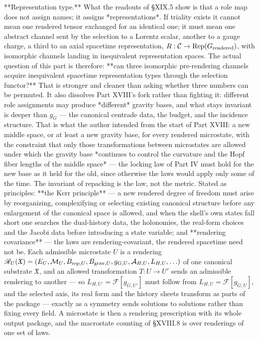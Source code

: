 **Representation type.** What the readouts of §XIX.5 show is that a role map does not assign names; it assigns *representations*. If triality exists it cannot mean one rendered tensor exchanged for an identical one; it must mean one abstract channel sent by the selection to a Lorentz scalar, another to a gauge charge, a third to an axial spacetime representation, $R:\mathcal C\to{\rm Rep}(G_{\rm rendered})$, with isomorphic channels landing in inequivalent representation spaces. The actual question of this part is therefore: **can three isomorphic pre-rendering channels acquire inequivalent spacetime representation types through the selection functor?** That is stronger and cleaner than asking whether three numbers can be permuted. It also dissolves Part XVIII's fork rather than fighting it: different role assignments may produce *different* gravity bases, and what stays invariant is deeper than $g_G$ — the canonical centrade data, the budget, and the incidence structure. That is what the author intended from the start of Part XVIII: a new middle space, or at least a new gravity base, for every rendered microstate, with the constraint that only those transformations between microstates are allowed under which the gravity base *continues to control the curvature and the Hopf fiber lengths of the middle space* — the locking law of Part IV must hold for the new base as it held for the old, since otherwise the laws would apply only some of the time. The invariant of repacking is the law, not the metric. Stated as principles: **the Kerr principle** — a new rendered degree of freedom must arise by reorganizing, complexifying or selecting existing canonical structure before any enlargement of the canonical space is allowed, and when the shell's own states fall short one searches the dual-history data, the holonomies, the real-form choices and the Jacobi data before introducing a state variable; and **rendering covariance** — the laws are rendering-covariant, the rendered spacetime need not be. Each admissible microstate $U$ is a rendering $\mathscr R_U(\mathfrak X) = (E_U,\mathcal M_U,B_{ {\rm rep},U},B_{ {\rm grav},U},g_{G,U},\mathcal A_{H,U},L_{H,U},\ldots)$ of one canonical substrate $\mathfrak X$, and an allowed transformation $T:U\to U'$ sends an admissible rendering to another — so $L_{H,U'} = \mathcal F[g_{G,U'}]$ must follow from $L_{H,U} = \mathcal F[g_{G,U}]$, and the selected axis, its real form and the history sheets transform as parts of the package — exactly as a symmetry sends solutions to solutions rather than fixing every field. A microstate is then a rendering prescription with its whole output package, and the macrostate counting of §XVIII.8 is over renderings of one set of laws.

